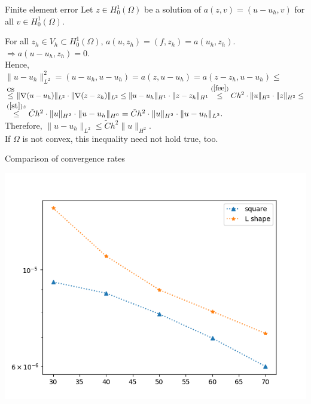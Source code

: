 \documentclass{beamer}
\begin{document}
\begin{frame}{Finite element error}
Let $z \in H_0^1(\Omega)$ be a solution of $a(z,v) = (u-u_h,v)$ for all  $v \in H_0^1(\Omega)$.

For all $z_h \in V_h \subset H_0^1(\Omega)$, $a(u,z_h) = (f,z_h) = a(u_h,z_h)$. $\Rightarrow a(u-u_h,z_h) = 0$.\\

\medskip
Hence, $\|u-u_h\|_{L^2}^2 = (u-u_h,u-u_h) = a(z,u-u_h) = a(z-z_h,u-u_h) \leq$\\
$\overset{\text{CS}}{\leq} \|\nabla(u-u_h)\|_{L^2} \cdot \|\nabla(z-z_h)\|_{L^2} \leq \|u-u_h\|_{H^1}  \cdot \|z-z_h\|_{H^1} \overset{(\ref{fee})}{\leq} Ch^2 \cdot \|u\|_{H^2} \cdot \|z\|_{H^2} \leq$\\
$\overset{(\ref{st}) z}{\leq} \tilde{C}h^2\cdot \|u\|_{H^2} \cdot \|u-u_h\|_{H^0} = \tilde{C}h^2\cdot \|u\|_{H^2}\cdot \|u-u_h\|_{L^2}.$\\

\medskip
Therefore, $\|u-u_h\|_{L^2} \leq \tilde{C}h^2 \|u\|_{H^2}$.\\[2.5ex]

If $\Omega$ is not convex, this inequality need not hold true, too.\\[0.9cm]


\end{frame}
\begin{frame}{Comparison of convergence rates}

\includegraphics[scale =0.5 \textwidth]{convergence_rate_after_n_steps.png} 
\end{frame}
\end{document}
